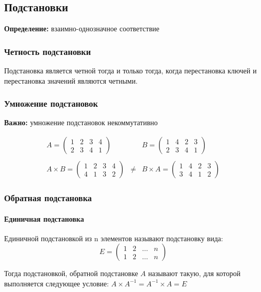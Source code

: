 \documentclass[class=article,a4paper,12pt,crop=false]{standalone}
\begin{document}
\subsection{Подстановки}

\textbf{Определение:} взаимно-однозначное соответствие

\subsubsection{Четность подстановки}

Подстановка является четной тогда и только тогда, когда перестановка
ключей и перестановка значений являются четными.

\subsubsection{Умножение подстановок}

\textbf{Важно:} умножение подстановок некоммутативно

\begin{equation}
  \begin{aligned}
    A = \begin{pmatrix}
      1 & 2 & 3 & 4 \\
      2 & 3 & 4 & 1
    \end{pmatrix} 
    & & B = \begin{pmatrix}
      1 & 4 & 2 & 3 \\
      2 & 3 & 4 & 1
    \end{pmatrix}\\ \\
    A \times B = \begin{pmatrix}
      1 & 2 & 3 & 4 \\
      4 & 1 & 3 & 2
    \end{pmatrix}
    & \neq & B \times A = \begin{pmatrix}
      1 & 4 & 2 & 3 \\
      3 & 4 & 1 & 2
    \end{pmatrix}
  \end{aligned}
\end{equation}

\subsubsection{Обратная подстановка}

\paragraph{Единичная подстановка}

Единичной подстановкой из n элементов называют подстановку вида:
\begin{equation}
  E = \begin{pmatrix}
    1 & 2 & \dots & n \\
    1 & 2 & \dots & n
  \end{pmatrix}
\end{equation}

Тогда подстановкой, обратной подстановке $A$ называют такую, для которой
выполняется следующее условие: $A\times A^{-1} = A^{-1}\times A = E$
\end{document}
